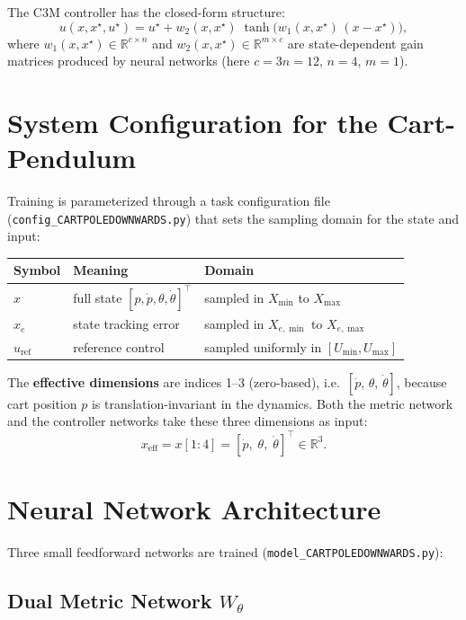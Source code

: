 \documentclass[11pt,a4paper]{article}
\begin{document}
The C3M controller has the closed-form structure:
\begin{equation}
    u(x, x^\star, u^\star)
    = u^\star + w_2(x,x^\star)\;\tanh\!\bigl(w_1(x,x^\star)\,(x - x^\star)\bigr),
    \label{eq:c3m_ctrl}
\end{equation}
where \(w_1(x,x^\star) \in \mathbb{R}^{c \times n}\) and \(w_2(x,x^\star) \in \mathbb{R}^{m \times c}\) are state-dependent gain matrices produced by neural networks (here \(c = 3n = 12\), \(n=4\), \(m=1\)).

\section{System Configuration for the Cart-Pendulum}
\label{sec:c3m_task_config}

Training is parameterized through a task configuration file (\texttt{config\_CARTPOLEDOWNWARDS.py}) that sets the sampling domain for the state and input:

\begin{center}
\begin{tabular}{lll}
\toprule
\textbf{Symbol} & \textbf{Meaning} & \textbf{Domain} \\
\midrule
\(x\) & full state \([p,\dot p,\theta,\dot\theta]^\top\) & sampled in  \(X_{\min}\) to \(X_{\max}\) \\
\(x_e\) & state tracking error & sampled in \(X_{e,\min}\) to \(X_{e,\max}\) \\
\(u_{\mathrm{ref}}\) & reference control & sampled uniformly in \([U_{\min}, U_{\max}]\) \\
\bottomrule
\end{tabular}
\end{center}

The \textbf{effective dimensions} are indices 1--3 (zero-based), i.e.\ \([\dot p,\,\theta,\,\dot\theta]\), because cart position \(p\) is translation-invariant in the dynamics.  Both the metric network and the controller networks take these three dimensions as input:
\[
x_{\mathrm{eff}} = x[1:4] = [\dot p,\;\theta,\;\dot\theta]^\top \in \mathbb{R}^3.
\]

\section{Neural Network Architecture}
\label{sec:c3m_arch}

Three small feedforward networks are trained (\texttt{model\_CARTPOLEDOWNWARDS.py}):

\subsection{Dual Metric Network \texorpdfstring{$W_\theta$}{W}}
\end{document}
